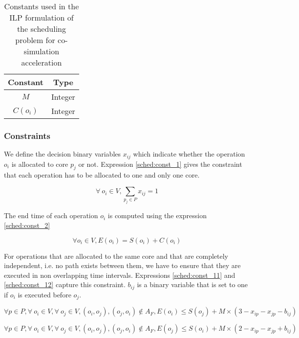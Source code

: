 \begin{table}
\caption{Constants used in the ILP formulation of the scheduling problem for co-simulation acceleration}
\centering
\label{tab:consilpsched}
\begin{tabular}{c c}
\toprule
Constant & Type \\
\midrule

$M$ & Integer  \\
$C(o_i)$ & Integer  \\

\bottomrule
\end{tabular}
\end{table}

\subsubsection{Constraints}

We define the decision binary variables $x_{ij}$ which indicate whether the operation $o_i$ is allocated to core $p_j$ or not. Expression \ref{sched:const_1} gives the constraint that each operation has to be allocated to one and only one core.

\begin{equation}
\forall\ o_i \in V, \sum_{p_j \in P}x_{ij}=1
\label{sched:const_1}
\end{equation}

The end time of each operation $o_i$ is computed using the expression \ref{sched:const_2}

\begin{equation}
\forall o_i \in V, E(o_i) = S(o_i) + C(o_i)
\label{sched:const_2}
\end{equation}

For operations that are allocated to the same core and that are completely independent, i.e. no path exists between them, we have to ensure that they are executed in non overlapping time intervals. Expressions \ref{sched:const_11} and \ref{sched:const_12} capture this constraint. $b_{ij}$ is a binary variable that is set to one if $o_i$ is executed before $o_j$.

\begin{equation}
\forall p \in P, \forall\ o_i \in V, \forall\ o_j \in V, (o_i,o_j), (o_j,o_i) \notin A_F, E(o_i) \leq S(o_j) + M \times (3 - x_{ip} - x_{jp} - b_{ij}) 
\label{sched:const_11}
\end{equation}

\begin{equation}
\forall p \in P, \forall\ o_i \in V, \forall\ o_j \in V, (o_i,o_j), (o_j,o_i) \notin A_F, E(o_j) \leq S(o_i) + M \times (2 - x_{ip} - x_{jp} + b_{ij}) 
\label{sched:const_12}
\end{equation}


